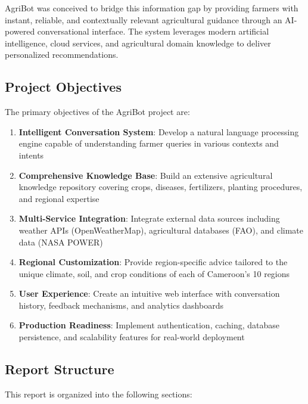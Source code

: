 \documentclass[12pt,a4paper]{article}
\begin{document}
AgriBot was conceived to bridge this information gap by providing farmers with instant, reliable, and contextually relevant agricultural guidance through an AI-powered conversational interface. The system leverages modern artificial intelligence, cloud services, and agricultural domain knowledge to deliver personalized recommendations.

\subsection{Project Objectives}

The primary objectives of the AgriBot project are:

\begin{enumerate}[leftmargin=*]
    \item \textbf{Intelligent Conversation System}: Develop a natural language processing engine capable of understanding farmer queries in various contexts and intents
    \item \textbf{Comprehensive Knowledge Base}: Build an extensive agricultural knowledge repository covering crops, diseases, fertilizers, planting procedures, and regional expertise
    \item \textbf{Multi-Service Integration}: Integrate external data sources including weather APIs (OpenWeatherMap), agricultural databases (FAO), and climate data (NASA POWER)
    \item \textbf{Regional Customization}: Provide region-specific advice tailored to the unique climate, soil, and crop conditions of each of Cameroon's 10 regions
    \item \textbf{User Experience}: Create an intuitive web interface with conversation history, feedback mechanisms, and analytics dashboards
    \item \textbf{Production Readiness}: Implement authentication, caching, database persistence, and scalability features for real-world deployment
\end{enumerate}

\subsection{Report Structure}

This report is organized into the following sections:
\end{document}
